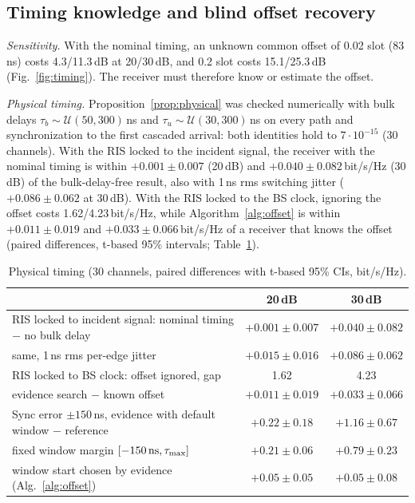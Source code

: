 \subsection{Timing knowledge and blind offset recovery}\label{sec:res-timing}
\emph{Sensitivity.} With the nominal timing, an unknown common offset of 0.02 slot (83\,ns) costs
4.3/11.3\,dB at 20/30\,dB, and 0.2 slot costs 15.1/25.3\,dB (Fig.~\ref{fig:timing}). The receiver must
therefore know or estimate the offset.

\emph{Physical timing.} Proposition~\ref{prop:physical} was checked numerically with bulk delays
$\tau_b\sim\mathcal U(50,300)$\,ns and $\tau_u\sim\mathcal U(30,300)$\,ns on every path and synchronization to the
first cascaded arrival: both identities hold to $7\cdot10^{-15}$ (30 channels). With the RIS locked to the incident
signal, the receiver with the nominal timing is within $+0.001\pm0.007$ (20\,dB) and $+0.040\pm0.082$\,bit/s/Hz (30\,dB)
of the bulk-delay-free result, also with 1\,ns rms switching jitter ($+0.086\pm0.062$ at 30\,dB). With the RIS locked to
the BS clock, ignoring the offset costs 1.62/4.23\,bit/s/Hz, while Algorithm~\ref{alg:offset} is within
$+0.011\pm0.019$ and $+0.033\pm0.066$\,bit/s/Hz of a receiver that knows the offset (paired differences, t-based 95\%
intervals; Table~\ref{tab:timing2}).

\begin{table}[!htbp]\centering
\caption{Physical timing (30 channels, paired differences with t-based 95\% CIs, bit/s/Hz).}\label{tab:timing2}
\begin{tabular}{lcc}\toprule
 & 20\,dB & 30\,dB \\\midrule
RIS locked to incident signal: nominal timing $-$ no bulk delay & $+0.001\pm0.007$ & $+0.040\pm0.082$ \\
\quad same, 1\,ns rms per-edge jitter & $+0.015\pm0.016$ & $+0.086\pm0.062$ \\
RIS locked to BS clock: offset ignored, gap & 1.62 & 4.23 \\
\quad evidence search $-$ known offset & $+0.011\pm0.019$ & $+0.033\pm0.066$ \\
Sync error $\pm150$\,ns, evidence with default window $-$ reference & $+0.22\pm0.18$ & $+1.16\pm0.67$ \\
\quad fixed window margin $[-150\,{\rm ns},\tau_{\max}]$ & $+0.21\pm0.06$ & $+0.79\pm0.23$ \\
\quad window start chosen by evidence (Alg.~\ref{alg:offset}) & $\bm{+0.05\pm0.05}$ & $\bm{+0.05\pm0.08}$ \\\bottomrule
\end{tabular}
\end{table}

